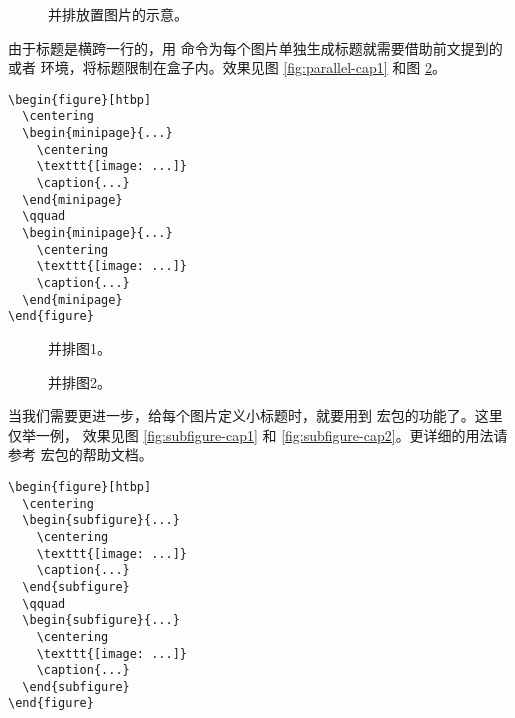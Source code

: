 \begin{figure}[htp]
  \centering
  \qquad
  \par\bigskip
  \caption{并排放置图片的示意。}\label{fig:parallel-fig}
\end{figure}

由于标题是横跨一行的，用  命令为每个图片单独生成标题就需要借助前文提到的 
或者  环境，将标题限制在盒子内。效果见图 \ref{fig:parallel-cap1} 和图 \ref{fig:parallel-cap2}。
\begin{verbatim}
\begin{figure}[htbp]
  \centering
  \begin{minipage}{...}
    \centering
    \texttt{[image: ...]}
    \caption{...}
  \end{minipage}
  \qquad
  \begin{minipage}{...}
    \centering
    \texttt{[image: ...]}
    \caption{...}
  \end{minipage}
\end{figure}
\end{verbatim}

\begin{figure}[htp]
  \centering
  \begin{minipage}{12em}
    \centering
    \caption{并排图1。}\label{fig:parallel-cap1}
  \end{minipage}
  \qquad
  \begin{minipage}{12em}
    \centering
    \caption{并排图2。}\label{fig:parallel-cap2}
  \end{minipage}
\end{figure}

当我们需要更进一步，给每个图片定义小标题时，就要用到  宏包的功能了。这里仅举一例，
效果见图 \ref{fig:subfigure-cap1} 和 \ref{fig:subfigure-cap2}。更详细的用法请参考 
宏包的帮助文档。
\begin{verbatim}
\begin{figure}[htbp]
  \centering
  \begin{subfigure}{...}
    \centering
    \texttt{[image: ...]}
    \caption{...}
  \end{subfigure}
  \qquad
  \begin{subfigure}{...}
    \centering
    \texttt{[image: ...]}
    \caption{...}
  \end{subfigure}
\end{figure}
\end{verbatim}

